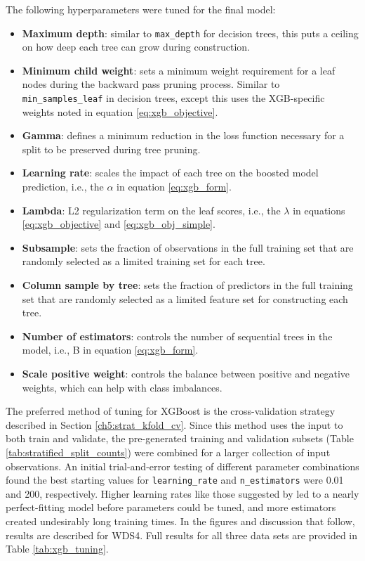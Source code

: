The following hyperparameters were tuned for the final model:
\begin{itemize}[itemsep=2pt]
    \item \textbf{Maximum depth}: similar to \verb|max_depth| for decision trees, this puts a ceiling on how deep each tree can grow during construction.
    \item \textbf{Minimum child weight}: sets a minimum weight requirement for a leaf nodes during the backward pass pruning process. Similar to \verb|min_samples_leaf| in decision trees, except this uses the XGB-specific weights noted in equation \ref{eq:xgb_objective}.
    \item \textbf{Gamma}: defines a minimum reduction in the loss function necessary for a split to be preserved during tree pruning. \item \textbf{Learning rate}: scales the impact of each tree on the boosted model prediction, i.e., the $\alpha$ in equation \ref{eq:xgb_form}.
    \item \textbf{Lambda}: L2 regularization term on the leaf scores, i.e., the $\lambda$ in equations \ref{eq:xgb_objective} and \ref{eq:xgb_obj_simple}.
    \item \textbf{Subsample}: sets the fraction of observations in the full training set that are randomly selected as a limited training set for each tree.
    \item \textbf{Column sample by tree}: sets the fraction of predictors in the full training set that are randomly selected as a limited feature set for constructing each tree.
    \item \textbf{Number of estimators}: controls the number of sequential trees in the model, i.e., B in equation \ref{eq:xgb_form}.
    \item \textbf{Scale positive weight}: controls the balance between positive and negative weights, which can help with class imbalances.
\end{itemize}

The preferred method of tuning for XGBoost is the cross-validation strategy described in Section \ref{ch5:strat_kfold_cv}. Since this method uses the input to both train and validate, the pre-generated training and validation subsets (Table \ref{tab:stratified_split_counts}) were combined for a larger collection of input observations. An initial trial-and-error testing of different parameter combinations found the best starting values for \verb|learning_rate| and \verb|n_estimators| were 0.01 and 200, respectively. Higher learning rates like those suggested by \citet{jain_xgboost_2016} led to a nearly perfect-fitting model before parameters could be tuned, and more estimators created undesirably long training times. In the figures and discussion that follow, results are described for WDS4. Full results for all three data sets are provided in Table \ref{tab:xgb_tuning}.

